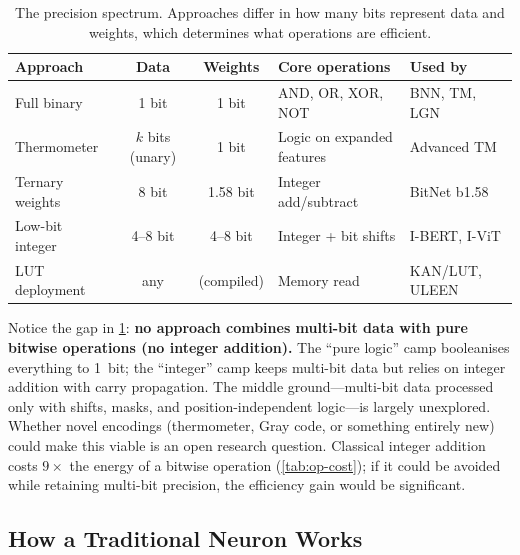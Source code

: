 \begin{table}[htbp]
\centering
\caption{The precision spectrum. Approaches differ in how many bits
  represent data and weights, which determines what operations are
  efficient.}
\label{tab:precision-map}
\small
\begin{tabular}{@{}p{2.6cm}ccp{3.7cm}l@{}}
  \toprule
  \textbf{Approach} & \textbf{Data} & \textbf{Weights}
    & \textbf{Core operations} & \textbf{Used by} \\
  \midrule
  Full binary
    & 1 bit & 1 bit
    & AND, OR, XOR, NOT
    & BNN, TM, LGN \\[3pt]
  Thermometer
    & $k$ bits (unary) & 1 bit
    & Logic on expanded features
    & Advanced TM \\[3pt]
  Ternary weights
    & 8 bit & 1.58 bit
    & Integer add/subtract
    & BitNet b1.58 \\[3pt]
  Low-bit integer
    & 4--8 bit & 4--8 bit
    & Integer + bit shifts
    & I-BERT, I-ViT \\[3pt]
  LUT deployment
    & any & (compiled)
    & Memory read
    & KAN/LUT, ULEEN \\
  \bottomrule
\end{tabular}
\end{table}

\begin{keyinsight}
Notice the gap in \cref{tab:precision-map}: \textbf{no approach
combines multi-bit data with pure bitwise operations (no integer
addition).} The ``pure logic'' camp booleanises everything to 1~bit;
the ``integer'' camp keeps multi-bit data but relies on integer
addition with carry propagation. The middle ground---multi-bit data
processed only with shifts, masks, and position-independent logic---is
largely unexplored. Whether novel encodings (thermometer, Gray code,
or something entirely new) could make this viable is an open research
question. Classical integer addition costs $9\times$ the energy of a
bitwise operation (\cref{tab:op-cost}); if it could be avoided while
retaining multi-bit precision, the efficiency gain would be
significant.
\end{keyinsight}

\subsection{How a Traditional Neuron Works}
\label{sec:traditional-neuron}

